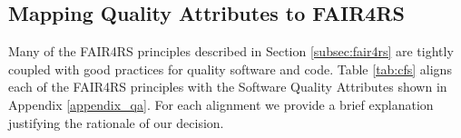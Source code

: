 \subsection{Mapping Quality Attributes to FAIR4RS}\label{subsec:fair4rs_fair}

Many of the FAIR4RS principles described in Section \ref{subsec:fair4rs}  are tightly coupled with good practices for quality software and code. Table \ref{tab:cfs} aligns each of the FAIR4RS principles with the Software Quality Attributes shown in Appendix \ref{appendix_qa}. For each alignment we provide a brief explanation justifying the rationale of our decision. 


